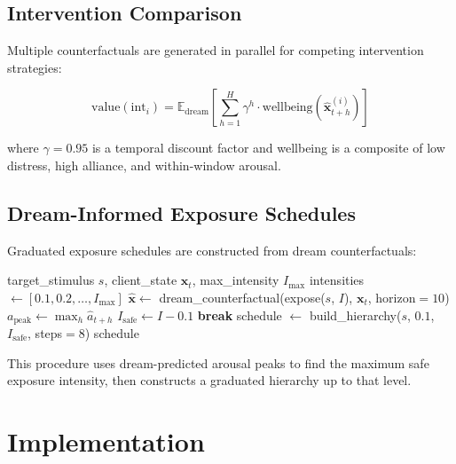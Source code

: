 \documentclass[11pt,a4paper]{article}
\begin{document}
\subsection{Intervention Comparison}

Multiple counterfactuals are generated in parallel for competing intervention strategies:

\begin{equation}
\text{value}(\text{int}_i) = \mathbb{E}_{\text{dream}}\left[\sum_{h=1}^{H} \gamma^h \cdot \text{wellbeing}(\hat{\mathbf{x}}_{t+h}^{(i)})\right]
\end{equation}

where $\gamma = 0.95$ is a temporal discount factor and wellbeing is a composite of low distress, high alliance, and within-window arousal.

\subsection{Dream-Informed Exposure Schedules}

Graduated exposure schedules are constructed from dream counterfactuals:

\begin{algorithm}[h]
\caption{Dream-Informed Graduated Exposure}
\label{alg:exposure}
\begin{algorithmic}[1]
\REQUIRE target\_stimulus $s$, client\_state $\mathbf{x}_t$, max\_intensity $I_{\max}$
\STATE intensities $\leftarrow [0.1, 0.2, \ldots, I_{\max}]$
    \STATE $\hat{\mathbf{x}} \leftarrow$ dream\_counterfactual(expose($s$, $I$), $\mathbf{x}_t$, horizon$=10$)
    \STATE $a_{\text{peak}} \leftarrow \max_h \hat{a}_{t+h}$
        \STATE $I_{\text{safe}} \leftarrow I - 0.1$ 
        \STATE \textbf{break}
    \ENDIF
\ENDFOR
\STATE schedule $\leftarrow$ build\_hierarchy($s$, $0.1$, $I_{\text{safe}}$, steps$= 8$)
\RETURN schedule
\end{algorithmic}
\end{algorithm}

This procedure uses dream-predicted arousal peaks to find the maximum safe exposure intensity, then constructs a graduated hierarchy up to that level.

\section{Implementation}
\end{document}
